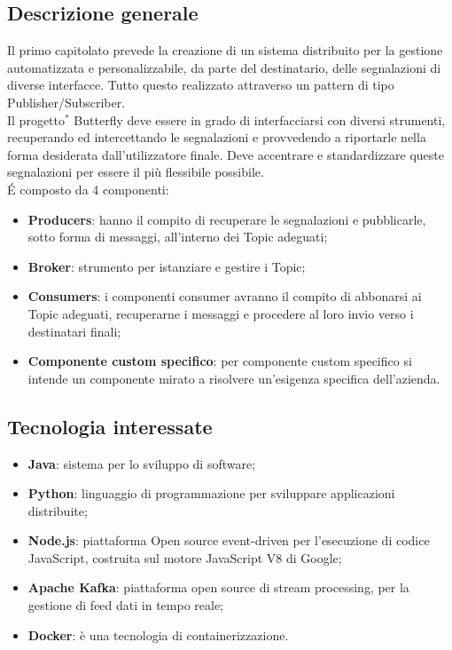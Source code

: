 \documentclass[11pt,a4paper]{article}
\begin{document}
	\subsection{Descrizione generale}
	Il primo capitolato prevede la creazione di un sistema distribuito per la gestione automatizzata e personalizzabile, da parte del destinatario, delle segnalazioni di diverse interfacce. Tutto questo realizzato attraverso un pattern di tipo Publisher/Subscriber. \\
	Il progetto$^*$ Butterfly deve essere in grado di interfacciarsi con diversi strumenti, recuperando ed intercettando le segnalazioni e provvedendo a riportarle nella forma desiderata dall'utilizzatore finale. Deve accentrare e standardizzare queste segnalazioni per essere il più flessibile possibile.\\
	\'E composto da 4 componenti:
	\begin{itemize}
		\item \textbf{Producers}: hanno il compito di recuperare le segnalazioni e pubblicarle, sotto forma di messaggi, all'interno dei Topic adeguati;
		\item \textbf{Broker}: strumento per istanziare e gestire i Topic;
		\item \textbf{Consumers}: i componenti consumer avranno il compito di abbonarsi ai Topic adeguati, recuperarne i	messaggi e procedere al loro invio verso i destinatari finali;
		\item \textbf{Componente custom specifico}: per componente custom specifico si intende un componente mirato a risolvere un'esigenza specifica dell'azienda. 
	\end{itemize}
	\subsection{Tecnologia interessate}
	\begin{itemize}
		\item \textbf{Java}: sistema per lo sviluppo di software;
		\item \textbf{Python}: linguaggio di programmazione per sviluppare applicazioni distribuite;
		\item \textbf{Node.js}: piattaforma Open source event-driven per l'esecuzione di codice JavaScript, costruita sul motore JavaScript V8 di Google;
		\item \textbf{Apache Kafka}: piattaforma open source di stream processing, per la gestione di feed dati in tempo reale;		
		\item \textbf{Docker}: è una tecnologia di containerizzazione.
	\end{itemize}
\end{document}
